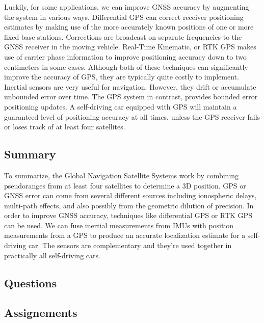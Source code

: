 Luckily, for some applications, we can improve GNSS accuracy by
augmenting the system in various ways. Differential GPS can correct receiver positioning
estimates by making use of the more accurately known positions
of one or more fixed base stations. Corrections are broadcast
on separate frequencies to the GNSS receiver in the moving vehicle. Real-Time Kinematic, or
RTK GPS makes use of carrier phase information to improve positioning accuracy down to
two centimeters in some cases. Although both of these techniques can significantly improve
the accuracy of GPS, they are typically quite
costly to implement. Inertial sensors are very
useful for navigation. However, they drift or accumulate
unbounded error over time. The GPS system in contrast, provides bounded error
positioning updates. A self-driving car equipped
with GPS will maintain a guaranteed level of positioning
accuracy at all times, unless the GPS receiver fails or loses
track of at least four satellites. 

\subsection{Summary}

To summarize, the Global Navigation Satellite
Systems work by combining pseudoranges from at least four
satellites to determine a 3D position. GPS or GNSS error can come from several different sources
including ionospheric delays, multi-path effects, and also possibly from the geometric
dilution of precision. In order to improve GNSS accuracy, techniques like differential GPS
or RTK GPS can be used.  We can fuse inertial
measurements from IMUs with position measurements
from a GPS to produce an accurate localization estimate
for a self-driving car. The sensors are complementary
and they're used together in practically all self-driving cars.

\subsection{Questions}

\subsection{Assignements}
 





